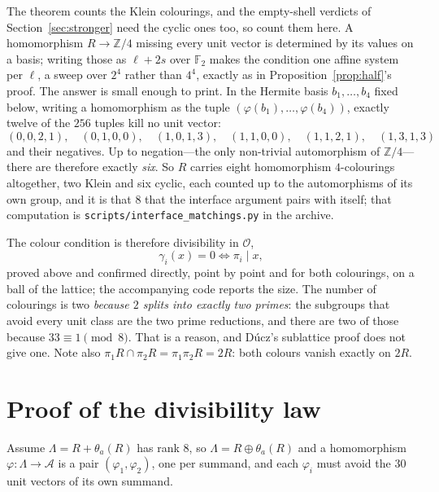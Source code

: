 \documentclass[11pt,reqno]{amsart}
\theoremstyle{plain}
\theoremstyle{definition}
\newcommand{\Z}{\mathbb{Z}}
\newcommand{\F}{\mathbb{F}}
\newcommand{\Lat}{R}
\newcommand{\Ok}{\mathcal{O}}
\newcommand{\Lam}{\Lambda}
\begin{document}
The theorem counts the Klein colourings, and the empty-shell verdicts of
Section~\ref{sec:stronger} need the cyclic ones too, so count them here. A homomorphism $\Lat \to \Z/4$ missing every
unit vector is determined by its values on a basis; writing those as
$\ell + 2s$ over $\F_2$ makes the condition one affine system per $\ell$, a sweep
over $2^4$ rather than $4^4$, exactly as in Proposition~\ref{prop:half}'s proof.
The answer is small enough to print. In the Hermite basis $b_1,\dots,b_4$ fixed
below, writing a homomorphism as the tuple $(\varphi(b_1),\dots,\varphi(b_4))$,
exactly twelve of the $256$ tuples kill no unit vector:
\[
  (0,0,2,1),\quad (0,1,0,0),\quad (1,0,1,3),\quad
  (1,1,0,0),\quad (1,1,2,1),\quad (1,3,1,3)
\]
and their negatives. Up to negation---the only non-trivial automorphism of
$\Z/4$---there are therefore exactly \emph{six}. So $\Lat$ carries eight homomorphism $4$-colourings altogether, two
Klein and six cyclic, each counted up to the automorphisms of its own group, and
it is that $8$ that the interface argument pairs with itself; that computation
is \texttt{scripts/interface\_matchings.py} in the archive.

The colour condition is therefore divisibility in $\Ok$,
\begin{equation}\label{eq:colour}
  \gamma_i(x) = 0 \iff \pi_i \mid x ,
\end{equation}
proved above and confirmed directly, point by point and for both colourings, on a
ball of the lattice; the accompanying code reports the size. The number of
colourings is two \emph{because $2$ splits into exactly two primes}: the subgroups
that avoid every unit class are the two prime reductions, and there are two of
those because $33 \equiv 1 \pmod 8$. That is a reason, and D\'ucz's sublattice
proof does not give one. Note also
$\pi_1\Lat \cap \pi_2\Lat = \pi_1\pi_2\Lat = 2\Lat$: both colours vanish exactly
on $2\Lat$.

\section{Proof of the divisibility law}\label{sec:proof}

Assume $\Lam = \Lat + \theta_a(\Lat)$ has rank $8$, so
$\Lam = \Lat \oplus \theta_a(\Lat)$ and a homomorphism $\varphi : \Lam \to \mathcal{A}$ is a
pair $(\varphi_1, \varphi_2)$, one per summand, and each $\varphi_i$ must avoid
the $30$ unit vectors of its own summand.
\end{document}
